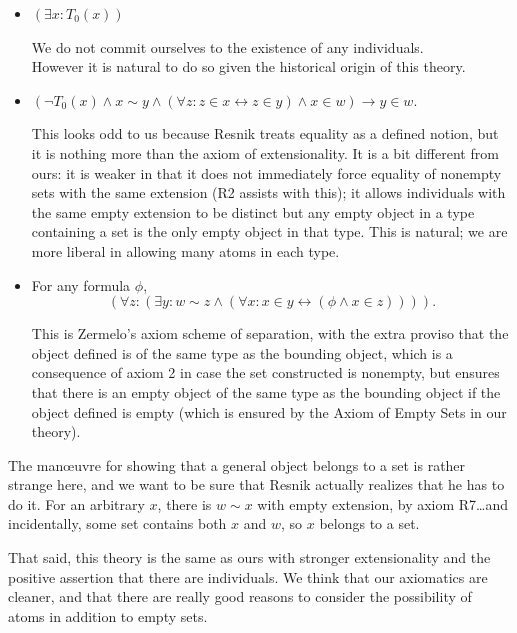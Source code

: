 \documentclass[12pt]{article}
\begin{document}
\begin{itemize}
\item[R5:] $(\exists x:T_0(x))$

  We do not commit ourselves to the existence of any individuals.\\
  However it is natural to do so given the historical origin of this theory.

\item[R6:] $(\neg T_0(x) \wedge x \sim y \wedge (\forall z:z \in x \leftrightarrow z \in y) \wedge x \in w) \rightarrow y \in w$.

  This looks odd to us because Resnik treats equality as a defined notion, but it is nothing more than the axiom of extensionality.  It is a bit different from ours:  it is weaker in that it does not immediately force equality of nonempty sets with the same extension (R2 assists with this);  it allows individuals with the same empty extension to be distinct but any empty object in a type containing a set is the only empty object in that type.  This is natural;  we are more liberal in allowing many atoms in each type.

\item[R7:] For any formula $\phi$, $$(\forall z:(\exists y:w \sim z \wedge (\forall x:x \in y \leftrightarrow (\phi \wedge x \in z)))).$$

  This is Zermelo's axiom scheme of separation, with the extra proviso that the  object defined is of the same type as the bounding object, which is a consequence of axiom 2 in case the set constructed is nonempty, but ensures that there is an empty object of the same type as the bounding object if the object defined is empty (which is ensured by the Axiom of Empty Sets in our theory).
\end{itemize}

The man{\oe}uvre for showing that a general object belongs to a set is
rather strange here, and we want to be sure that Resnik actually
realizes that he has to do it.  For an arbitrary $x$, there is $w \sim
x$ with empty extension, by axiom R7\ldots and incidentally, some set
contains both $x$ and $w$, so $x$ belongs to a set.

That said, this theory is the same as ours with stronger extensionality and the positive assertion that there are individuals.  We think that our axiomatics are cleaner, and that there are really good reasons to consider the possibility of atoms in addition to empty sets.
\end{document}
